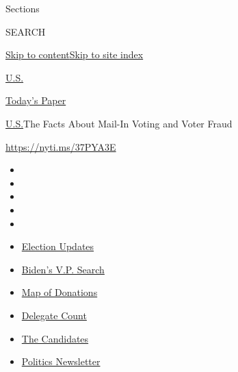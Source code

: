 Sections

SEARCH

\protect\hyperlink{site-content}{Skip to
content}\protect\hyperlink{site-index}{Skip to site index}

\href{https://www.nytimes3xbfgragh.onion/section/us}{U.S.}

\href{https://myaccount.nytimes3xbfgragh.onion/auth/login?response_type=cookie\&client_id=vi}{}

\href{https://www.nytimes3xbfgragh.onion/section/todayspaper}{Today's
Paper}

\href{/section/us}{U.S.}\textbar{}The Facts About Mail-In Voting and
Voter Fraud

\url{https://nyti.ms/37PYA3E}

\begin{itemize}
\item
\item
\item
\item
\item
\end{itemize}

\begin{itemize}
\item
  \href{https://www.nytimes3xbfgragh.onion/2020/08/03/us/elections/biden-vs-trump.html?action=click\&pgtype=Article\&state=default\&region=TOP_BANNER\&context=storylines_menu}{Election
  Updates}
\item
  \href{https://www.nytimes3xbfgragh.onion/article/biden-vice-president-2020.html?action=click\&pgtype=Article\&state=default\&region=TOP_BANNER\&context=storylines_menu}{Biden's
  V.P. Search}
\item
  \href{https://www.nytimes3xbfgragh.onion/interactive/2020/07/24/us/politics/trump-biden-campaign-donors.html?action=click\&pgtype=Article\&state=default\&region=TOP_BANNER\&context=storylines_menu}{Map
  of Donations}
\item
  \href{https://www.nytimes3xbfgragh.onion/interactive/2020/us/elections/delegate-count-primary-results.html?action=click\&pgtype=Article\&state=default\&region=TOP_BANNER\&context=storylines_menu}{Delegate
  Count}
\item
  \href{https://www.nytimes3xbfgragh.onion/interactive/2019/us/politics/2020-presidential-candidates.html?action=click\&pgtype=Article\&state=default\&region=TOP_BANNER\&context=storylines_menu}{The
  Candidates}
\item
  \href{https://www.nytimes3xbfgragh.onion/newsletters/politics?action=click\&pgtype=Article\&state=default\&region=TOP_BANNER\&context=storylines_menu}{Politics
  Newsletter}
\end{itemize}

